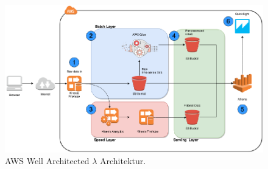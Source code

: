 \begin{figure}[H]
\centering
\includegraphics[width=0.92\textheight,angle=90,origin=c]{graphics/AWS-Lambda-Architecture.pdf}
\caption[AWS Well Architected $\lambda$ Architektur]{AWS Well Architected $\lambda$ Architektur.\footnotemark}
\label{abb:AWSWellArchitectedLambda}
\end{figure}
